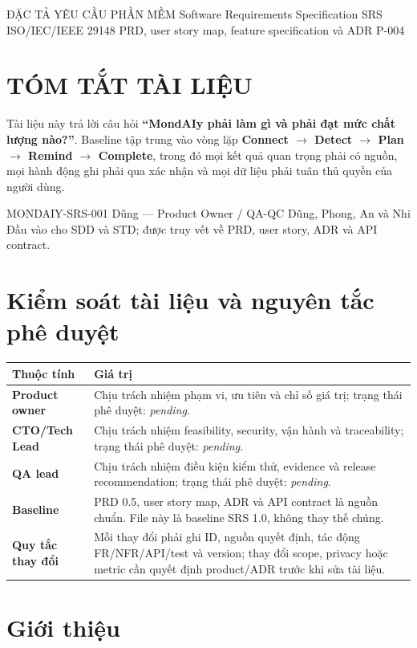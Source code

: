 \documentclass[12pt,a4paper]{article}
\begin{document}
\mondaiycover
  {ĐẶC TẢ YÊU CẦU PHẦN MỀM}
  {Software Requirements Specification}
  {SRS}
  {ISO/IEC/IEEE 29148}
  {PRD, user story map, feature specification và ADR P-004}
\mondaiyfrontmatter

\section*{TÓM TẮT TÀI LIỆU}
\begin{keybox}
Tài liệu này trả lời câu hỏi \textbf{``MondAIy phải làm gì và phải đạt mức chất
lượng nào?''}. Baseline tập trung vào vòng lặp
\textbf{Connect $\rightarrow$ Detect $\rightarrow$ Plan $\rightarrow$ Remind
$\rightarrow$ Complete}, trong đó mọi kết quả quan trọng phải có nguồn, mọi hành
động ghi phải qua xác nhận và mọi dữ liệu phải tuân thủ quyền của người dùng.
\end{keybox}

\mondaiymetadata
  {MONDAIY-SRS-001}
  {Dũng --- Product Owner / QA-QC}
  {Dũng, Phong, An và Nhi}
  {Đầu vào cho SDD và STD; được truy vết về PRD, user story, ADR và API contract.}

\section{Kiểm soát tài liệu và nguyên tắc phê duyệt}
\begin{tabularx}{\textwidth}{>{\bfseries}p{3.5cm}X}
\toprule Thuộc tính & Giá trị \\ \midrule
Product owner & Chịu trách nhiệm phạm vi, ưu tiên và chỉ số giá trị; trạng thái phê duyệt: \emph{pending}. \\
CTO/Tech Lead & Chịu trách nhiệm feasibility, security, vận hành và traceability; trạng thái phê duyệt: \emph{pending}. \\
QA lead & Chịu trách nhiệm điều kiện kiểm thử, evidence và release recommendation; trạng thái phê duyệt: \emph{pending}. \\
Baseline & PRD 0.5, user story map, ADR và API contract là nguồn chuẩn. File này là baseline SRS 1.0, không thay thế chúng. \\
Quy tắc thay đổi & Mỗi thay đổi phải ghi ID, nguồn quyết định, tác động FR/NFR/API/test và version; thay đổi scope, privacy hoặc metric cần quyết định product/ADR trước khi sửa tài liệu. \\
\bottomrule
\end{tabularx}

\section{Giới thiệu}
\end{document}
